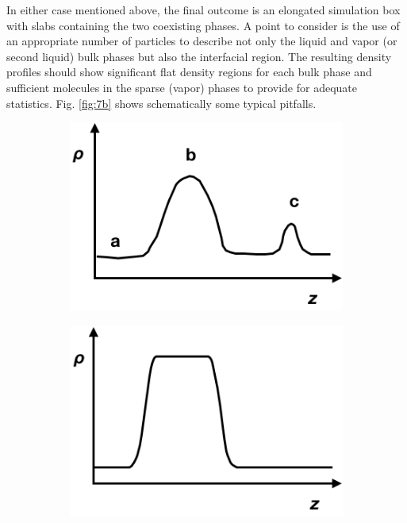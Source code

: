 \documentclass[9pt,bestpractices]{livecoms}
\begin{document}
In either case mentioned above, the final outcome is an elongated simulation
box with slabs containing the two coexisting phases. A point to consider is the
use of an appropriate number of particles to describe not only the liquid and
vapor (or second liquid) bulk phases but also the interfacial region. The
resulting density profiles should show significant flat density regions for
each bulk phase and sufficient molecules in the sparse (vapor) phases to
provide for adequate statistics. Fig. \ref{fig:7b} shows schematically some typical
pitfalls.

\begin{figure}
	\centering
	\begin{subfigure}{0.3\textwidth} %
    \includegraphics[width=1\textwidth]{gfx/image20.png}
	\end{subfigure}
	\begin{subfigure}{0.3\textwidth} %
    \includegraphics[width=1\textwidth]{gfx/image21.png}

\end{subfigure}
\end{figure}
\end{document}
